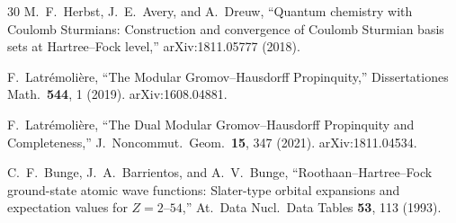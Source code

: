 \documentclass[aps,pra,twocolumn,superscriptaddress,longbibliography]{revtex4-2}
\begin{document}
\begin{thebibliography}{30}
M.~F.~Herbst, J.~E.~Avery, and A.~Dreuw, ``Quantum chemistry with
  Coulomb Sturmians: Construction and convergence of Coulomb Sturmian
  basis sets at Hartree--Fock level,'' arXiv:1811.05777 (2018).

F.~Latr\'emoli\`ere, ``The Modular Gromov--Hausdorff Propinquity,''
  Dissertationes Math.\ \textbf{544}, 1 (2019).
  arXiv:1608.04881.

F.~Latr\'emoli\`ere, ``The Dual Modular Gromov--Hausdorff Propinquity and Completeness,''
  J.~Noncommut.\ Geom.\ \textbf{15}, 347 (2021).
  arXiv:1811.04534.

C.~F.~Bunge, J.~A.~Barrientos, and A.~V.~Bunge, ``Roothaan--Hartree--Fock
  ground-state atomic wave functions: Slater-type orbital expansions and
  expectation values for $Z = 2$--$54$,''
  At.\ Data Nucl.\ Data Tables \textbf{53}, 113 (1993).

\end{thebibliography}
\end{document}
